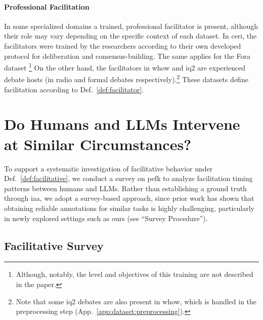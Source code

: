 \documentclass[11pt]{article}
\theoremstyle{definition}
\theoremstyle{plain}
\begin{document}
\paragraph{Professional Facilitation} In some specialized domains a trained, professional facilitator is present, although their role may vary depending on the specific context of each dataset. In \ac{ceri}, the facilitators were trained by the researchers according to their own developed protocol for deliberation and consensus-building. The same applies for the Fora dataset \citep{schroeder-etal-2024-fora}\footnote{Although, notably, the level and objectives of this training are not described in the paper.} On the other hand, the facilitators in \ac{whow} and \ac{iq2} are experienced debate hosts (in radio and formal debates respectively).\footnote{Note that some \ac{iq2} debates are also present in \ac{whow}, which is handled in the preprocessing step (App.~\ref{app:dataset:preprocessing}).} These datasets define facilitation according to Def.~\ref{def:facilitator}.


\section{Do Humans and LLMs Intervene at Similar Circumstances?}
\label{sec:annotation}

To support a systematic investigation of facilitative behavior under Def.~\ref{def:facilitative}, we conduct a survey on \ac{pefk} to analyze facilitation timing patterns between humans and LLMs. Rather than establishing a ground truth through \ac{iaa}, we adopt a survey-based approach, since prior work has shown that obtaining reliable annotations for similar tasks is highly challenging, particularly in newly explored settings such as ours (see ``Survey Procedure'').


\subsection{Facilitative Survey}
\label{sec:annotation:experimental}
\end{document}
